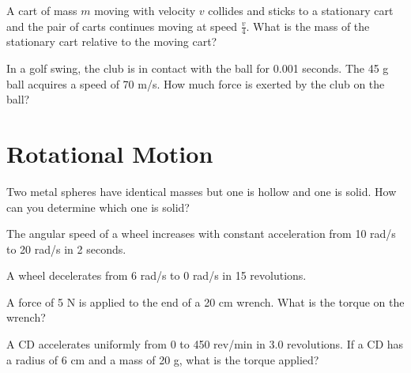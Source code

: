 \documentclass[fleqn,addpoints]{exam}
\begin{document}
\begin{questions}
\question A cart of mass $m$ moving with velocity $v$ collides and sticks to
a stationary cart and the pair of carts continues moving at speed $\frac{v}{4}$.
What is the mass of the stationary cart relative to the moving cart?

\question In a golf swing, the club is in contact with the ball for 0.001
seconds.  The 45 g ball acquires a speed of 70 m/s.  How much force is exerted
by the club on the ball?

\section{Rotational Motion}

\question
Two metal spheres have identical masses but one is hollow and one is solid.  How can you determine which one is solid?

\question The angular speed of a wheel increases with constant acceleration
from 10 rad/s to 20 rad/s in 2 seconds.

\question
A wheel decelerates from 6 rad/s to 0 rad/s in 15 revolutions.

\question A force of 5 N is applied to the end of a 20 cm wrench.  What is the torque on the wrench?

\question A CD accelerates uniformly from 0 to 450 rev/min in 3.0
revolutions.  If a CD has a radius of 6 cm and a mass of 20 g, what is the
torque applied?

\end{questions}
\end{document}
